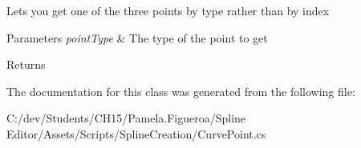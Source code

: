 Lets you get one of the three points by type rather than by index 


\begin{DoxyParams}{Parameters}
{\em point\+Type} & The type of the point to get \\
\hline
\end{DoxyParams}
\begin{DoxyReturn}{Returns}

\end{DoxyReturn}


The documentation for this class was generated from the following file\+:\begin{DoxyCompactItemize}
\item 
C\+:/dev/\+Students/\+C\+H15/\+Pamela.\+Figueroa/\+Spline Editor/\+Assets/\+Scripts/\+Spline\+Creation/Curve\+Point.\+cs\end{DoxyCompactItemize}
